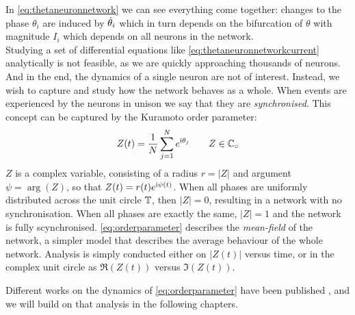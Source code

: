 In \eqref{eq:thetaneuronnetwork} we can see everything come together: changes to the phase $\theta_i$ are induced by ${\dot{\theta}}_i$ which in turn depends on the bifurcation of $\theta$ with magnitude $I_i$ which depends on all neurons in the network.\\


Studying a set of differential equations like \eqref{eq:thetaneuronnetworkcurrent} analytically is not feasible, as we are quickly approaching thousands of neurons. And in the end, the dynamics of a single neuron are not of interest. Instead, we wish to capture and study how the network behaves as a whole. When events are experienced by the neurons in unison we say that they are \textsl{synchronised}. This concept can be captured by the Kuramoto order parameter:
\begin{align}
Z(t) = \frac{1}{N} \sum_{j=1}^N e^{{\rm{i}}\theta_j}  \qquad Z \in \mathbb{C}_\circ \label{eq:orderparameter}
\end{align}
$Z$ is a complex variable, consisting of a radius $r = \rvert Z \rvert$ and argument $\psi = \arg \left( Z \right)$, so that $Z(t) = r(t) e^{{\rm{i}} \psi(t)}$. When all phases are uniformly distributed across the unit circle ${\mathbb{T}}$, then $\rvert Z \rvert = 0$, resulting in a network with no synchronisation. When all phases are exactly the same, $\rvert Z \rvert = 1$ and the network is fully scynchronised. \eqref{eq:orderparameter} describes the \textsl{mean-field} of the network, a simpler model that describes the average behaviour of the whole network. Analysis is simply conducted either on $ \rvert Z(t) \rvert$ versus time, or in the complex unit circle as $\Re (Z(t))$ versus $\Im (Z(t))$.

Different works on the dynamics of \eqref{eq:orderparameter} have been published \cite{Luke2013, Martens2020}, and we will build on that analysis in the following chapters.


